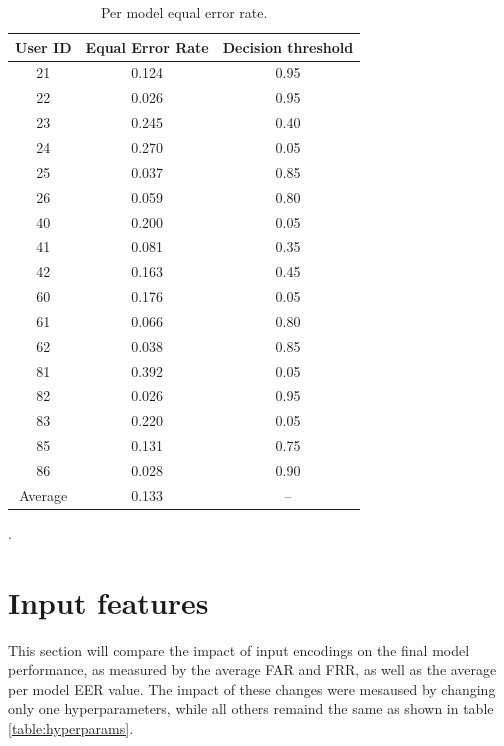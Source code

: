 \begin{center}
	\begin{table}[H]
		\begin{center}
			\begin{tabular}{ |c|c|c| } 
				\hline
				User ID & Equal Error Rate & Decision threshold \\
				\hline
				21 & 0.124 & 0.95 \\
				\hline
				22 & 0.026 & 0.95 \\
				\hline
				23 & 0.245 & 0.40 \\
				\hline
				24 & 0.270 & 0.05 \\
				\hline
				25 & 0.037 & 0.85 \\
				\hline
				26 & 0.059 & 0.80 \\
				\hline
				40 & 0.200 & 0.05 \\
				\hline
				41 & 0.081 & 0.35 \\
				\hline
				42 & 0.163 & 0.45 \\
				\hline
				60 & 0.176 & 0.05 \\
				\hline
				61 & 0.066 & 0.80 \\
				\hline
				62 & 0.038 & 0.85 \\
				\hline
				81 & 0.392 & 0.05 \\
				\hline
				82 & 0.026 & 0.95 \\
				\hline
				83 & 0.220 & 0.05 \\
				\hline
				85 & 0.131 & 0.75 \\
				\hline
				86 & 0.028 & 0.90 \\
				\hline
				\hline
				Average & 0.133 & -- \\
				\hline
			\end{tabular}
		\end{center}
		\caption{Per model equal error rate.}
		\label{table:EER_separate}
	\end{table}
\end{center}

.


\section{Input features}
This section will compare the impact of input encodings on the final model performance, as measured by the average FAR and FRR, as well as the average per model EER value. The impact of these changes were mesaused by changing only one hyperparameters, while all others remaind the same as shown in table \ref{table:hyperparams}.

